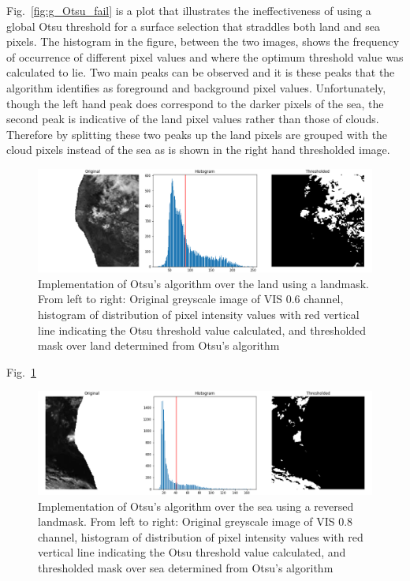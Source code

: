 Fig.~\ref{fig:g_Otsu_fail} is a plot that illustrates the ineffectiveness of using a global Otsu threshold for a surface selection that straddles both land and sea pixels. The histogram in the figure, between the two images, shows the frequency of occurrence of different pixel values and where the optimum threshold value was calculated to lie. Two main peaks can be observed and it is these peaks that the algorithm identifies as foreground and background pixel values. Unfortunately, though the left hand peak does correspond to the darker pixels of the sea, the second peak is indicative of the land pixel values rather than those of clouds. Therefore by splitting these two peaks up the land pixels are grouped with the cloud pixels instead of the sea as is shown in the right hand thresholded image.

\begin{figure}
    \centering
    \includegraphics[width=1\textwidth]{landmask_Otsu_threshold_2019-01-05 122743.png}
    \caption{Implementation of Otsu's algorithm over the land using a landmask. From left to right: Original greyscale image of VIS 0.6 channel, histogram of distribution of pixel intensity values with red vertical line indicating the Otsu threshold value calculated, and thresholded mask over land determined from Otsu's algorithm}
    \label{fig:bOtsu_land}
\end{figure}

Fig.~\ref{fig:bOtsu_land}

\begin{figure}
    \centering
    \includegraphics[width=1\textwidth]{seamask_Otsu_threshold_2019-01-05 122743.png}
    \caption{Implementation of Otsu's algorithm over the sea using a reversed landmask. From left to right: Original greyscale image of VIS 0.8 channel, histogram of distribution of pixel intensity values with red vertical line indicating the Otsu threshold value calculated, and thresholded mask over sea determined from Otsu's algorithm}
    \label{fig:bOtsu_sea}
\end{figure}

